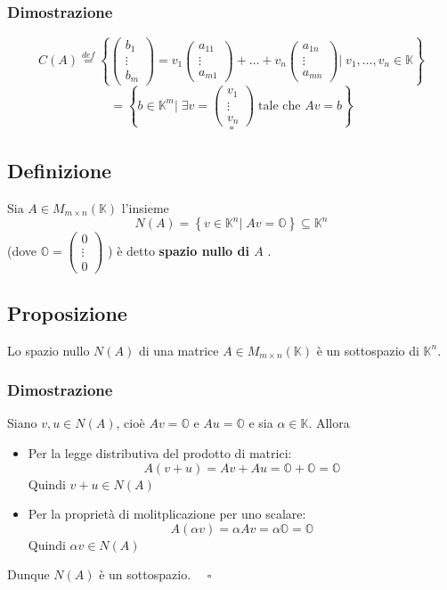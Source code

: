\documentclass[a4paper]{article}
\theoremstyle{break}
\theoremstyle{break}
\theoremstyle{break}
\theoremstyle{break}
\begin{document}
\subsubsection{Dimostrazione}
\[
  C(A) \stackrel{def}{=} \left\{ \begin{pmatrix} 
      b_1\\
      \vdots\\
      b_m
  \end{pmatrix}
  =
  v_1 \begin{pmatrix} 
    a_{11}\\
    \vdots\\
    a_{m1}
  \end{pmatrix} 
  +
  \ldots
  +
  v_n \begin{pmatrix} 
    a_{1n}\\
    \vdots\\
    a_{mn}
  \end{pmatrix}
  \Big |\; v_1, \ldots, v_n \in \mathbb{K} 
\right\}
\] 
\[
 = \left\{
   b \in \mathbb{K}^m \Big |\; \exists v = \begin{pmatrix}
     v_1\\
     \vdots\\
     v_n
   \end{pmatrix} 
   \; \text{tale che }
   Av = b
\right\}
\] 
\[
\square
\] 

\subsection{Definizione}
Sia \( A \in M_{m \times n}(\mathbb{K}) \) l'insieme 
\[
  N(A) = \left\{ v \in \mathbb{K}^n \Big | \; Av = \mathbb{O} \right\} \subseteq \mathbb{K}^n 
\] 
(dove \( \mathbb{O} = \begin{pmatrix} 0\\ \vdots\\ 0 \end{pmatrix}  \) ) è detto
\textbf{spazio nullo di \( A \) }.

\subsection{Proposizione}
Lo spazio nullo \( N(A) \) di una matrice \( A \in M_{m \times n}(\mathbb{K}) \) è un
sottospazio di \( \mathbb{K}^n \).

\subsubsection{Dimostrazione}
Siano \( v,u \in N(A) \), cioè \( Av = \mathbb{O} \) e \( Au = \mathbb{O} \) e sia
\( \alpha \in \mathbb{K} \). Allora
\begin{itemize}
  \item Per la legge distributiva del prodotto di matrici:
  \[
  A(v+u) = Av + Au = \mathbb{O} + \mathbb{O} = \mathbb{O}
  \] 
  Quindi \( v+u \in N(A) \)
\item Per la proprietà di molitplicazione per uno scalare:
  \[
  A(\alpha v) = \alpha Av = \alpha \mathbb{O} = \mathbb{O}
  \] 
  Quindi \( \alpha v \in N(A) \)
\end{itemize}
Dunque \( N(A) \) è un sottospazio. \( \quad \square \) 
\end{document}

